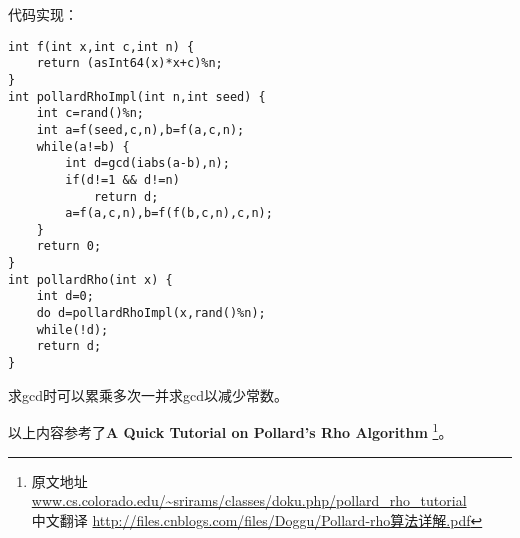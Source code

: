 代码实现：
\begin{lstlisting}[title=Pollard Rho]
int f(int x,int c,int n) {
    return (asInt64(x)*x+c)%n;
}
int pollardRhoImpl(int n,int seed) {
    int c=rand()%n;
    int a=f(seed,c,n),b=f(a,c,n);
    while(a!=b) {
        int d=gcd(iabs(a-b),n);
        if(d!=1 && d!=n)
            return d;
        a=f(a,c,n),b=f(f(b,c,n),c,n);
    }
    return 0;
}
int pollardRho(int x) {
    int d=0;
    do d=pollardRhoImpl(x,rand()%n);
    while(!d);
    return d;
}
\end{lstlisting}

求gcd时可以累乘多次一并求gcd以减少常数。

以上内容参考了{\bfseries A Quick Tutorial on Pollard's Rho Algorithm}
\footnote{原文地址
\url{www.cs.colorado.edu/~srirams/classes/doku.php/pollard\_rho\_tutorial}
\\中文翻译
\url{http://files.cnblogs.com/files/Doggu/Pollard-rho算法详解.pdf}
}。
